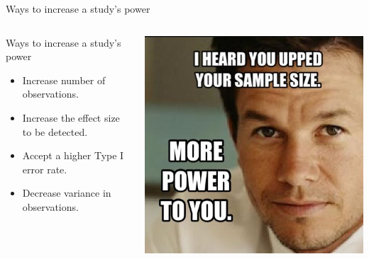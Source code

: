 \documentclass[ignorenonframetext,]{beamer}
\begin{document}
\begin{frame}{Ways to increase a study's power}

\begin{columns}
\begin{column}{0.6\textwidth}
\begin{block}{Ways to increase a study's power}
\begin{itemize}
  \item Increase number of observations.
  \item Increase the effect size to be detected.
  \item Accept a higher Type I error rate. 
  \item Decrease variance in observations.
\end{itemize}
\end{block}
\end{column}

\begin{column}{0.4\textwidth}

\begin{center}\includegraphics[width=\textwidth]{images/sample_size} \end{center}
\end{column}
\end{columns}

\end{frame}
\end{document}
